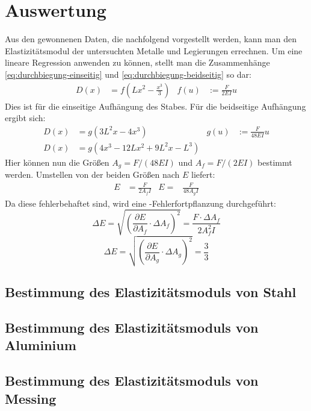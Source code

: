 
\section{Auswertung}

Aus den gewonnenen Daten, die nachfolgend vorgestellt werden, kann man
den Elastizitätsmodul der untersuchten Metalle und Legierungen
errechnen. Um eine lineare Regression anwenden zu können, stellt man die
Zusammenhänge \eqref{eq:durchbiegung-einseitig} und
\eqref{eq:durchbiegung-beidseitig} so dar:
%
\begin{align}
  \label{eq:lineare-durchbiegung-einseitig}
  D(x) &= f(Lx^2-\frac{x^3}{3}) & f(u) &:= \frac{F}{2EI}u
\end{align}
Dies ist für die einseitige Aufhängung des Stabes. Für die beidseitige
Aufhängung ergibt sich:
\begin{align}
  \label{eq:lineare-durchbiegung-beidseitig1}
  D(x) &= g(3L^2x-4x^3) & g(u) &:= \frac{F}{48EI}u\\
  \label{eq:lineare-durchbiegung-beidseitig2}
  D(x) &= g(4x^3-12Lx^2 + 9L^2x - L^3)
\end{align}
%
Hier können nun die Größen $A_g = F/(48EI)$ und $A_f = F/(2EI)$ bestimmt
werden. Umstellen von der beiden Größen nach $E$ liefert:
\begin{align}
  E &= \frac{F}{2A_fI} & E =& \frac{F}{48A_gI}
\end{align}
Da diese fehlerbehaftet sind, wird eine -Fehlerfortpflanzung
durchgeführt:
%
\begin{equation}
  \label{eq:gaussfehler-f}
  \Delta E = \sqrt{\left(\frac{\partial E}{\partial A_f}\cdot\Delta A_f\right)^2}
  = \frac{F\cdot\Delta A_f}{2A_f^2I}
\end{equation}
%
\begin{equation}
  \label{eq:gaussfehler-g}
  \Delta E = \sqrt{\left(\frac{\partial E}{\partial A_g}\cdot\Delta
      A_g\right)^2}
  = \frac{3}{3}
\end{equation}

\subsection{Bestimmung des Elastizitätsmoduls von Stahl}


\subsection{Bestimmung des Elastizitätsmoduls von Aluminium}


\subsection{Bestimmung des Elastizitätsmoduls von Messing}




